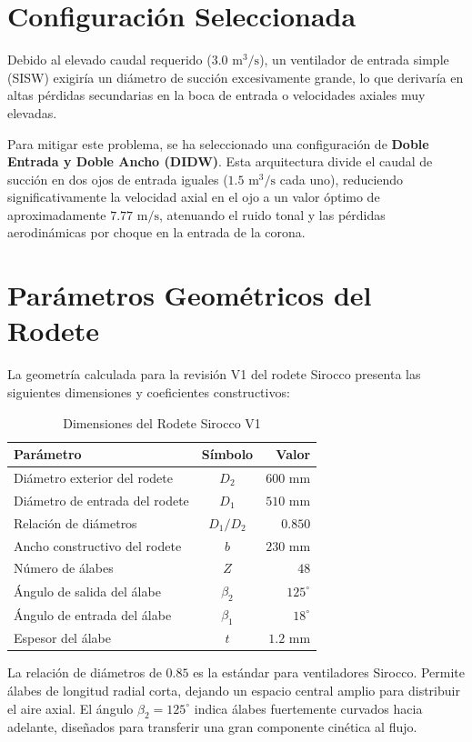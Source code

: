 \documentclass[12pt,a4paper]{article}
\begin{document}
\section{Configuración Seleccionada}
Debido al elevado caudal requerido ($3.0\text{ m}^3/\text{s}$), un ventilador de entrada simple (SISW) exigiría un diámetro de succión excesivamente grande, lo que derivaría en altas pérdidas secundarias en la boca de entrada o velocidades axiales muy elevadas.

Para mitigar este problema, se ha seleccionado una configuración de \textbf{Doble Entrada y Doble Ancho (DIDW)}. Esta arquitectura divide el caudal de succión en dos ojos de entrada iguales ($1.5\text{ m}^3/\text{s}$ cada uno), reduciendo significativamente la velocidad axial en el ojo a un valor óptimo de aproximadamente $7.77\text{ m/s}$, atenuando el ruido tonal y las pérdidas aerodinámicas por choque en la entrada de la corona.

\section{Parámetros Geométricos del Rodete}
La geometría calculada para la revisión V1 del rodete Sirocco presenta las siguientes dimensiones y coeficientes constructivos:

\begin{table}[H]
\centering
\caption{Dimensiones del Rodete Sirocco V1}
\begin{tabular}{lcr}
\toprule
\textbf{Parámetro} & \textbf{Símbolo} & \textbf{Valor} \\
\midrule
Diámetro exterior del rodete & $D_2$ & $600\text{ mm}$ \\
Diámetro de entrada del rodete & $D_1$ & $510\text{ mm}$ \\
Relación de diámetros & $D_1/D_2$ & $0.850$ \\
Ancho constructivo del rodete & $b$ & $230\text{ mm}$ \\
Número de álabes & $Z$ & $48$ \\
Ángulo de salida del álabe & $\beta_2$ & $125^\circ$ \\
Ángulo de entrada del álabe & $\beta_1$ & $18^\circ$ \\
Espesor del álabe & $t$ & $1.2\text{ mm}$ \\
\bottomrule
\end{tabular}
\end{table}

La relación de diámetros de $0.85$ es la estándar para ventiladores Sirocco. Permite álabes de longitud radial corta, dejando un espacio central amplio para distribuir el aire axial. El ángulo $\beta_2 = 125^\circ$ indica álabes fuertemente curvados hacia adelante, diseñados para transferir una gran componente cinética al flujo.
\end{document}
